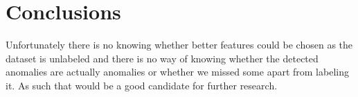 \chapter{Conclusions}\label{ch:conclusions}

Unfortunately there is no knowing whether better features could be chosen as the dataset is unlabeled and there is no way of knowing whether the detected anomalies are actually anomalies or whether we missed some apart from labeling it. As such that would be a good candidate for further research.
